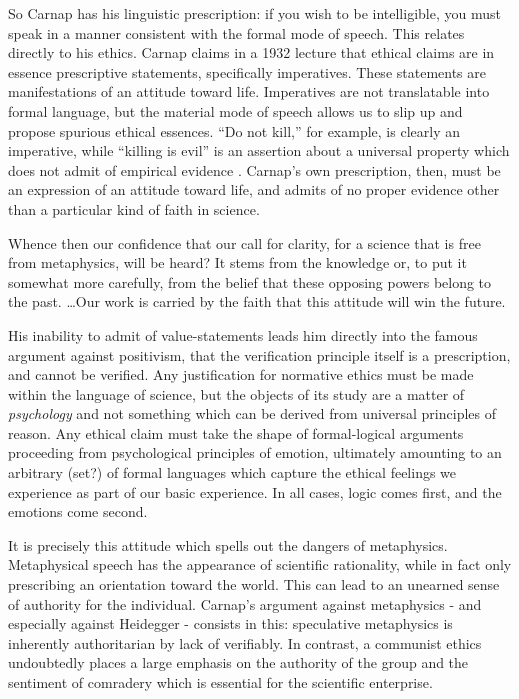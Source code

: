 \documentclass[leqno, 12pt]{turabian-researchpaper}
\begin{document}
	So Carnap has his linguistic prescription: if you wish to be intelligible, you
	must speak in a manner consistent with the formal mode of speech. This relates
	directly to his ethics. Carnap claims in a 1932 lecture that ethical claims are
	in essence prescriptive statements, specifically imperatives. These statements
	are manifestations of an attitude toward life. Imperatives are not
	translatable into formal language, but the material mode of speech allows us to
	slip up and propose spurious ethical essences. \enquote{Do not kill,} for example,
	is clearly an imperative, while \enquote{killing is evil} is an assertion
	about a universal property which does not admit of empirical evidence
	\autocite[\S1.4]{carnap1996}. Carnap's own prescription, then, must be an
	expression of an attitude toward life, and admits of no proper evidence other than
	a particular kind of faith in science.

	\begin{displayquote}
		 Whence then our confidence that our call for
		clarity, for a science that is free from metaphysics, will be heard? It
		stems from the knowledge or, to put it somewhat more carefully, from the
		belief that these opposing powers belong to the past. \dots Our work is carried
		by the faith that this attitude will win the future.
	\end{displayquote}

	His inability to admit of value-statements leads him directly into the famous
	argument against positivism, that the verification principle itself is a prescription,
	and cannot be verified. Any justification for normative ethics must be made within
	the language of science, but the objects of its study are a matter of \emph{psychology}
	and not something which can be derived from universal principles of reason.
	Any ethical claim must take the shape of formal-logical arguments proceeding
	from psychological principles of emotion, ultimately amounting to an arbitrary
	(set?) of formal languages which capture the ethical feelings we experience as
	part of our basic experience. In all cases, logic comes first, and the emotions
	come second.

	It is precisely this attitude which spells out the dangers of metaphysics.
	Metaphysical speech has the appearance of scientific rationality, while in fact
	only prescribing an orientation toward the world. This can lead to an unearned
	sense of authority for the individual. Carnap's argument against metaphysics -
	and especially against Heidegger - consists in this: speculative metaphysics
	is inherently authoritarian by lack of verifiably. In contrast, a communist
	ethics undoubtedly places a large emphasis on the authority of the group and
	the sentiment of comradery which is essential for the scientific enterprise.
\end{document}
